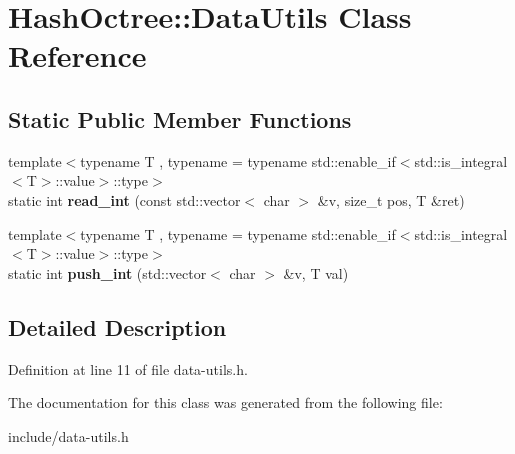 \hypertarget{class_hash_octree_1_1_data_utils}{}\section{Hash\+Octree\+::Data\+Utils Class Reference}
\label{class_hash_octree_1_1_data_utils}
\subsection*{Static Public Member Functions}
\begin{DoxyCompactItemize}
\item 
\mbox{\label{class_hash_octree_1_1_data_utils_a77f66d23f50e240c3556b69149c297ec}} 
{\footnotesize template$<$typename T , typename  = typename std\+::enable\+\_\+if$<$std\+::is\+\_\+integral$<$\+T$>$\+::value$>$\+::type$>$ }\\static int {\bfseries read\+\_\+int} (const std\+::vector$<$ char $>$ \&v, size\+\_\+t pos, T \&ret)
\item 
\mbox{\label{class_hash_octree_1_1_data_utils_a2f5a79c2b9a52a82f3afbee15b3e8dd8}} 
{\footnotesize template$<$typename T , typename  = typename std\+::enable\+\_\+if$<$std\+::is\+\_\+integral$<$\+T$>$\+::value$>$\+::type$>$ }\\static int {\bfseries push\+\_\+int} (std\+::vector$<$ char $>$ \&v, T val)
\end{DoxyCompactItemize}


\subsection{Detailed Description}


Definition at line 11 of file data-\/utils.\+h.



The documentation for this class was generated from the following file\+:\begin{DoxyCompactItemize}
\item 
include/data-\/utils.\+h\end{DoxyCompactItemize}
